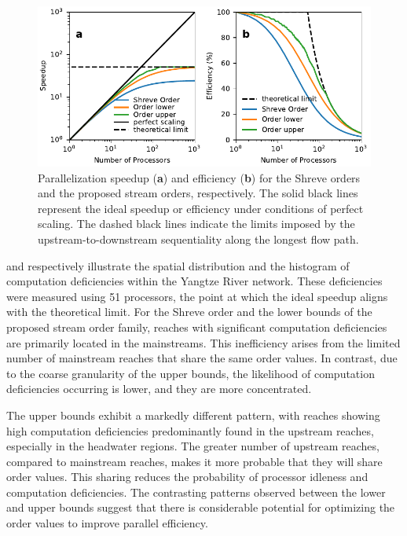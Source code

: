 \documentclass[water,article,submit,pdftex,moreauthors]{Definitions/mdpi}
\begin{document}
\begin{figure}[H]
    \includegraphics[width=13.5cm]{fig/speedup_yangtze.pdf}
    \caption{Parallelization speedup (\textbf{a}) and efficiency (\textbf{b}) for the Shreve orders and the proposed stream orders, respectively. The solid black lines represent the ideal speedup or efficiency under conditions of perfect scaling. The dashed black lines indicate the limits imposed by the upstream-to-downstream sequentiality along the longest flow path. \label{fig:scalability_yangtze}}
\end{figure}

 and  respectively illustrate the spatial distribution and the histogram of computation deficiencies within the Yangtze River network. These deficiencies were measured using 51 processors, the point at which the ideal speedup aligns with the theoretical limit. For the Shreve order and the lower bounds of the proposed stream order family, reaches with significant computation deficiencies are primarily located in the mainstreams. This inefficiency arises from the limited number of mainstream reaches that share the same order values. In contrast, due to the coarse granularity of the upper bounds, the likelihood of computation deficiencies occurring is lower, and they are more concentrated.

The upper bounds exhibit a markedly different pattern, with reaches showing high computation deficiencies predominantly found in the upstream reaches, especially in the headwater regions. The greater number of upstream reaches, compared to mainstream reaches, makes it more probable that they will share order values. This sharing reduces the probability of processor idleness and computation deficiencies. The contrasting patterns observed between the lower and upper bounds suggest that there is considerable potential for optimizing the order values to improve parallel efficiency.
\end{document}
